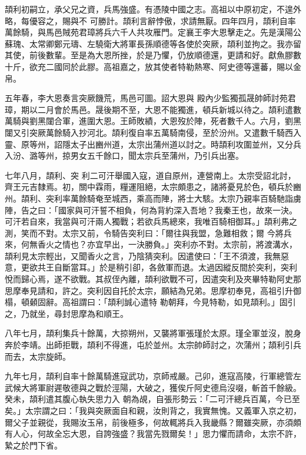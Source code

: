 \begin{pinyinscope}
 頡利初嗣立，承父兄之資，兵馬強盛。有憑陵中國之志。高祖以中原初定，不遑外略，每優容之，賜與不
 可勝計。頡利言辭悖傲，求請無厭。四年四月，頡利自率萬餘騎，與馬邑賊苑君璋將兵六千人共攻雁門。定襄王李大恩擊走之。先是漢陽公蘇瑰、太常卿鄭元璹、左驍衛大將軍長孫順德等各使於突厥，頡利並拘之。我亦留其使，前後數輩。至是為大恩所挫，於是乃懼，仍放順德還，更請和好。獻魚膠數十斤，欲充二國同於此膠。高祖嘉之，放其使者特勒熱寒、阿史德等還蕃，賜以金帛。



 五年春，李大恩奏言突厥饑荒，馬邑可圖。詔大恩與
 殿內少監獨孤晟帥師討苑君璋，期以二月會於馬邑。晟後期不至，大恩不能獨進，頓兵新城以待之。頡利遣數萬騎與劉黑闥合軍，進圍大恩。王師敗績，大恩歿於陣，死者數千人。六月，劉黑闥又引突厥萬餘騎入抄河北。頡利復自率五萬騎南侵，至於汾州。又遣數千騎西入靈、原等州，詔隱太子出豳州道，太宗出蒲州道以討之。時頡利攻圍並州，又分兵入汾、潞等州，掠男女五千餘口，聞太宗兵至蒲州，乃引兵出塞。



 七年八月，頡利、突
 利二可汗舉國入寇，道自原州，連營南上。太宗受詔北討，齊王元吉隸焉。初，關中霖雨，糧運阻絕，太宗頗患之，諸將憂見於色，頓兵於豳州。頡利、突利率萬餘騎奄至城西，乘高而陣，將士大駭。太宗乃親率百騎馳詣虜陣，告之曰：「國家與可汗誓不相負，何為背約深入吾地？我秦王也，故來一決。可汗若自來，我當與可汗兩人獨戰；若欲兵馬總來，我唯百騎相御耳。」頡利弗之測，笑而不對。太宗又前，令騎告突利曰：「爾往與我盟，急難相救；爾
 今將兵來，何無香火之情也？亦宜早出，一決勝負。」突利亦不對。太宗前，將渡溝水，頡利見太宗輕出，又聞香火之言，乃陰猜突利。因遣使曰：「王不須渡，我無惡意，更欲共王自斷當耳。」於是稍引卻，各斂軍而退。太過因縱反間於突利，突利悅而歸心焉，遂不欲戰。其叔侄內離，頡利欲戰不可，因遣突利及夾畢特勒阿史那思摩奉見請和，許之。突利因自托於太宗，願結為兄弟。思摩初奉見，高祖引升御榻，頓顙固辭。高祖謂曰：「頡利誠心遣特
 勒朝拜，今見特勒，如見頡利。」固引之，乃就坐，尋封思摩為和順王。



 八年七月，頡利集兵十餘萬，大掠朔州，又襲將軍張瑾於太原。瑾全軍並沒，脫身奔於李靖。出師拒戰，頡利不得進，屯於並州。太宗帥師討之，次蒲州；頡利引兵而去，太宗旋師。



 九年七月，頡利自率十餘萬騎進寇武功，京師戒嚴。己卯，進寇高陵，行軍總管左武候大將軍尉遲敬德與之戰於涇陽，大破之，獲俟斤阿史德烏沒啜，斬首千餘級。癸未，頡利遣其腹心執失思力入
 朝為覘，自張形勢云：「二可汗總兵百萬，今已至矣。」太宗謂之曰：「我與突厥面自和親，汝則背之，我實無愧。又義軍入京之初，爾父子並親從，我賜汝玉帛，前後極多，何故輒將兵入我畿縣？爾雖突厥，亦須頗有人心，何故全忘大恩，自誇強盛？我當先戮爾矣！」思力懼而請命，太宗不許，縶之於門下省。




\end{pinyinscope}
